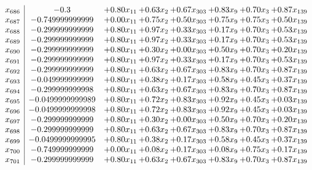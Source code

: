 \documentclass[8pt]{article}
\begin{document}
\[\begin{array}{c| c c@{\hskip 2pt} c@{\hskip 2pt} c@{\hskip 2pt} c@{\hskip 2pt} c@{\hskip 2pt} c@{\hskip 2pt} }
 x_{686}   &  -0.3 & +  0.80 x_{11} & +  0.63 x_{2} & +  0.67 x_{303} & +  0.83 x_{9} & +  0.70 x_{3} & +  0.87 x_{139}\\
 x_{687}   &  -0.749999999999 & +  0.00 x_{11} & +  0.75 x_{2} & +  0.50 x_{303} & +  0.75 x_{9} & +  0.75 x_{3} & +  0.50 x_{139}\\
 x_{688}   &  -0.299999999999 & +  0.80 x_{11} & +  0.97 x_{2} & +  0.33 x_{303} & +  0.17 x_{9} & +  0.70 x_{3} & +  0.53 x_{139}\\
 x_{689}   &  -0.299999999999 & +  0.80 x_{11} & +  0.97 x_{2} & +  0.33 x_{303} & +  0.17 x_{9} & +  0.70 x_{3} & +  0.53 x_{139}\\
 x_{690}   &  -0.299999999999 & +  0.80 x_{11} & +  0.30 x_{2} & +  0.00 x_{303} & +  0.50 x_{9} & +  0.70 x_{3} & +  0.20 x_{139}\\
 x_{691}   &  -0.299999999999 & +  0.80 x_{11} & +  0.97 x_{2} & +  0.33 x_{303} & +  0.17 x_{9} & +  0.70 x_{3} & +  0.53 x_{139}\\
 x_{692}   &  -0.299999999999 & +  0.80 x_{11} & +  0.63 x_{2} & +  0.67 x_{303} & +  0.83 x_{9} & +  0.70 x_{3} & +  0.87 x_{139}\\
 x_{693}   &  -0.049999999999 & +  0.80 x_{11} & +  0.38 x_{2} & +  0.17 x_{303} & +  0.58 x_{9} & +  0.45 x_{3} & +  0.37 x_{139}\\
 x_{694}   &  -0.299999999998 & +  0.80 x_{11} & +  0.63 x_{2} & +  0.67 x_{303} & +  0.83 x_{9} & +  0.70 x_{3} & +  0.87 x_{139}\\
 x_{695}   &  -0.0499999999989 & +  0.80 x_{11} & +  0.72 x_{2} & +  0.83 x_{303} & +  0.92 x_{9} & +  0.45 x_{3} & +  0.03 x_{139}\\
 x_{696}   &  -0.0499999999998 & +  0.80 x_{11} & +  0.72 x_{2} & +  0.83 x_{303} & +  0.92 x_{9} & +  0.45 x_{3} & +  0.03 x_{139}\\
 x_{697}   &  -0.299999999999 & +  0.80 x_{11} & +  0.30 x_{2} & +  0.00 x_{303} & +  0.50 x_{9} & +  0.70 x_{3} & +  0.20 x_{139}\\
 x_{698}   &  -0.299999999999 & +  0.80 x_{11} & +  0.63 x_{2} & +  0.67 x_{303} & +  0.83 x_{9} & +  0.70 x_{3} & +  0.87 x_{139}\\
 x_{699}   &  -0.0499999999995 & +  0.80 x_{11} & +  0.38 x_{2} & +  0.17 x_{303} & +  0.58 x_{9} & +  0.45 x_{3} & +  0.37 x_{139}\\
 x_{700}   &  -0.749999999999 & +  0.00 x_{11} & +  0.08 x_{2} & +  0.17 x_{303} & +  0.08 x_{9} & +  0.75 x_{3} & +  0.17 x_{139}\\
 x_{701}   &  -0.299999999999 & +  0.80 x_{11} & +  0.63 x_{2} & +  0.67 x_{303} & +  0.83 x_{9} & +  0.70 x_{3} & +  0.87 x_{139}\\

\end{array}\]
\end{document}
